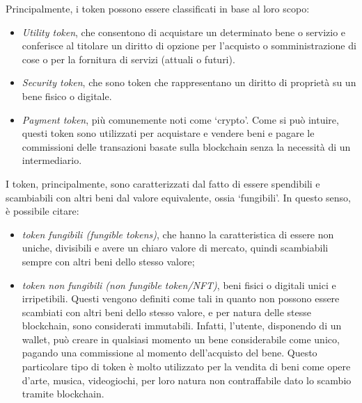 Principalmente, i token possono essere classificati in base al loro scopo:
\begin{itemize}
    \item \textit{Utility token}, che consentono di acquistare un determinato bene o servizio e conferisce al titolare un diritto di opzione per l'acquisto o somministrazione di cose o per la fornitura di servizi (attuali o futuri). 
    \item \textit{Security token}, che sono token che rappresentano un diritto di proprietà su un bene fisico o digitale.
    \item \textit{Payment token}, più comunemente noti come `crypto'. Come si può intuire, questi token sono utilizzati per acquistare e vendere beni e pagare le commissioni delle transazioni basate sulla blockchain senza la necessità di un intermediario.
\end{itemize}

I token, principalmente, sono caratterizzati dal fatto di essere spendibili e scambiabili con altri beni dal valore equivalente, ossia `fungibili'.
In questo senso, è possibile citare:
\begin{itemize}
    \item \textit{token fungibili (fungible tokens)}, che hanno la caratteristica di essere non uniche, divisibili e avere un chiaro valore di mercato, quindi scambiabili sempre con altri beni dello stesso valore;
    \item \textit{token non fungibili (non fungible token/NFT)}, beni fisici o digitali unici e irripetibili. Questi vengono definiti come tali in quanto non possono essere scambiati con altri beni dello stesso valore,
    e per natura delle stesse blockchain, sono considerati immutabili. Infatti, l'utente, disponendo di un wallet, può creare in qualsiasi momento un bene considerabile come unico, pagando una commissione al momento dell'acquisto del bene.
    Questo particolare tipo di token è molto utilizzato per la vendita di beni come opere d'arte, musica, videogiochi, per loro natura non contraffabile dato lo scambio tramite blockchain.
\end{itemize}

